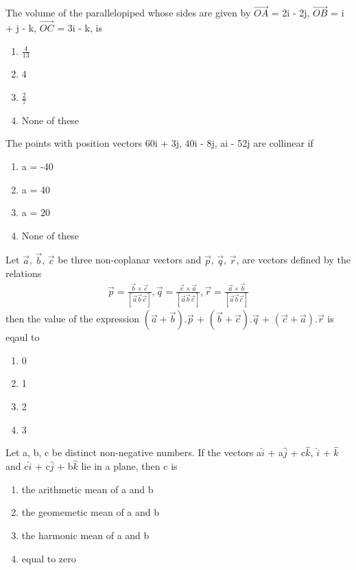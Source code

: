 \item The volume of the parallelopiped whose sides are given by $\overrightarrow{OA}$ = 2i - 2j, $\overrightarrow{OB}$ = i + j - k, $\overrightarrow{OC}$ = 3i - k, is
\begin{enumerate}
\item $\frac{4}{13}$
\item 4
\item $\frac{2}{7}$
\item None of these
\end{enumerate}

\item The points with position vectors 60i + 3j, 40i - 8j, ai - 52j are collinear if
\begin{enumerate}
\item a = -40
\item a = 40
\item a = 20
\item None of these
\end{enumerate}

\item Let $\overrightarrow{a}$, $\overrightarrow{b}$, $\overrightarrow{c}$ be three non-coplanar vectors and $\overrightarrow{p}$, $\overrightarrow{q}$, $\overrightarrow{r}$, are vectors defined by the relations 
\begin{align*}
\overrightarrow{p} = \frac{\overrightarrow{b} \times \overrightarrow{c}}{[\overrightarrow{a}\overrightarrow{b}\overrightarrow{c}]}, \overrightarrow{q} = \frac{\overrightarrow{c} \times \overrightarrow{a}}{[\overrightarrow{a}\overrightarrow{b}\overrightarrow{c}]}, \overrightarrow{r} = \frac{\overrightarrow{a} \times \overrightarrow{b}}{[\overrightarrow{a}\overrightarrow{b}\overrightarrow{c}]}
\end{align*}
then the value of the expression $(\overrightarrow{a} + \overrightarrow{b}).\overrightarrow{p}$ + $(\overrightarrow{b} + \overrightarrow{c}).\overrightarrow{q}$ + $(\overrightarrow{c} + \overrightarrow{a}).\overrightarrow{r}$ is eqaul to
\begin{enumerate}
\item 0
\item 1
\item 2
\item 3
\end{enumerate}

\item Let a, b, c be distinct non-negative numbers. If the vectors a$\hat{i}$ + a$\hat{j}$ + c$\hat{k}$, 
$\hat{i}$ + $\hat{k}$ and c$\hat{i}$ + c$\hat{j}$ + b$\hat{k}$ lie in a plane, then c is
\begin{enumerate}
\item the arithmetic mean of a and b
\item the geomemetic mean of a and b
\item the harmonic mean of a and b
\item equal to zero
\end{enumerate}

